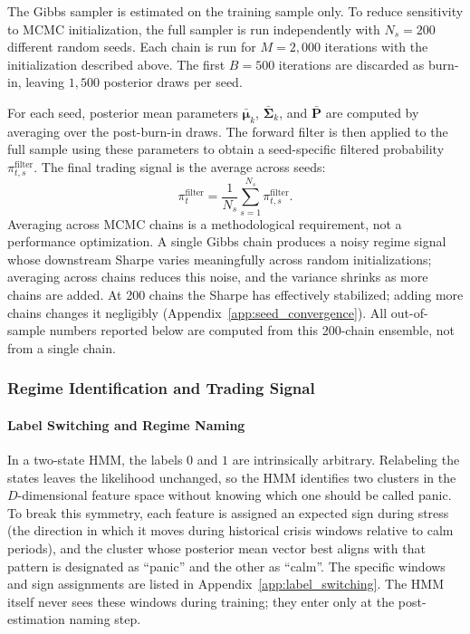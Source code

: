 The Gibbs sampler is estimated on the training sample only. To reduce sensitivity to MCMC initialization, the full sampler is run independently with $N_s = 200$ different random seeds. Each chain is run for $M=2{,}000$ iterations with the initialization described above. The first $B=500$ iterations are discarded as burn-in, leaving $1{,}500$ posterior draws per seed.

For each seed, posterior mean parameters $\bar{\boldsymbol{\mu}}_k$, $\bar{\boldsymbol{\Sigma}}_k$, and $\bar{\mathbf{P}}$ are computed by averaging over the post-burn-in draws. The forward filter is then applied to the full sample using these parameters to obtain a seed-specific filtered probability $\pi_{t,s}^{\text{filter}}$. The final trading signal is the average across seeds:
\begin{equation}
\pi_t^{\text{filter}} = \frac{1}{N_s} \sum_{s=1}^{N_s} \pi_{t,s}^{\text{filter}}.
\end{equation}
Averaging across MCMC chains is a methodological requirement, not a performance optimization. A single Gibbs chain produces a noisy regime signal whose downstream Sharpe varies meaningfully across random initializations; averaging across chains reduces this noise, and the variance shrinks as more chains are added. At 200 chains the Sharpe has effectively stabilized; adding more chains changes it negligibly (Appendix~\ref{app:seed_convergence}). All out-of-sample numbers reported below are computed from this 200-chain ensemble, not from a single chain.

\subsubsection{Regime Identification and Trading Signal}\label{sec:regime_signal}

\paragraph{Label Switching and Regime Naming}\label{sec:label_switching}

In a two-state HMM, the labels $0$ and $1$ are intrinsically arbitrary. Relabeling the states leaves the likelihood unchanged, so the HMM identifies two clusters in the $D$-dimensional feature space without knowing which one should be called panic. To break this symmetry, each feature is assigned an expected sign during stress (the direction in which it moves during historical crisis windows relative to calm periods), and the cluster whose posterior mean vector best aligns with that pattern is designated as ``panic'' and the other as ``calm''. The specific windows and sign assignments are listed in Appendix~\ref{app:label_switching}. The HMM itself never sees these windows during training; they enter only at the post-estimation naming step.

